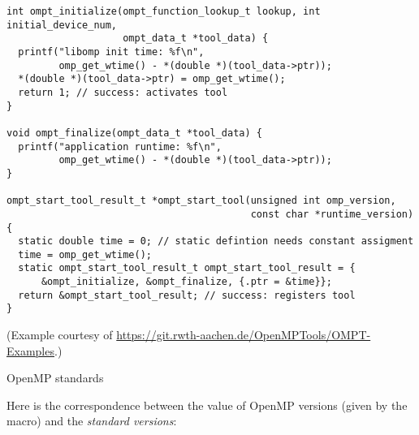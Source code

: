 \begin{lstlisting}
int ompt_initialize(ompt_function_lookup_t lookup, int initial_device_num,
                    ompt_data_t *tool_data) {
  printf("libomp init time: %f\n",
         omp_get_wtime() - *(double *)(tool_data->ptr));
  *(double *)(tool_data->ptr) = omp_get_wtime();
  return 1; // success: activates tool
}

void ompt_finalize(ompt_data_t *tool_data) {
  printf("application runtime: %f\n",
         omp_get_wtime() - *(double *)(tool_data->ptr));
}

ompt_start_tool_result_t *ompt_start_tool(unsigned int omp_version,
                                          const char *runtime_version) {
  static double time = 0; // static defintion needs constant assigment
  time = omp_get_wtime();
  static ompt_start_tool_result_t ompt_start_tool_result = {
      &ompt_initialize, &ompt_finalize, {.ptr = &time}};
  return &ompt_start_tool_result; // success: registers tool
}  
\end{lstlisting}
(Example courtesy of \url{https://git.rwth-aachen.de/OpenMPTools/OMPT-Examples}.)

 {OpenMP standards}
\label{sec:omp-standards}

Here is the correspondence between the value of OpenMP versions
(given by the  macro)
and the \emph{standard versions}:

